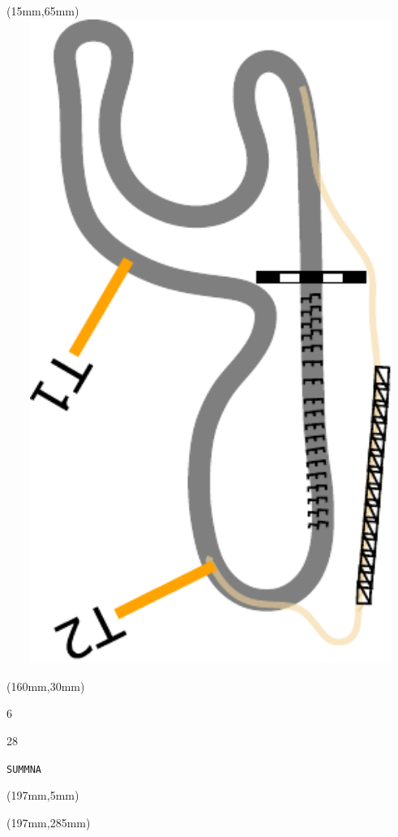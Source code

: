 \begin{textblock*}{185mm}(15mm,65mm)%
\centering
\mbox{\includegraphics[width=185mm,height=210mm,keepaspectratio]{PT/SUMMNA.pdf}}
\end{textblock*}
\begin{textblock*}{40mm}(160mm,30mm)%
\Large
\par{} 
\par6 
\par28 
\par\hfill\tiny\tt SUMMNA\\
\end{textblock*}
\begin{textblock*}{20mm}(197mm,5mm)%
\fbox{\thepage}
\label{SUMMNA}
\end{textblock*}
\begin{textblock*}{20mm}(197mm,285mm)%
\fbox{\thepage}
\end{textblock*}

